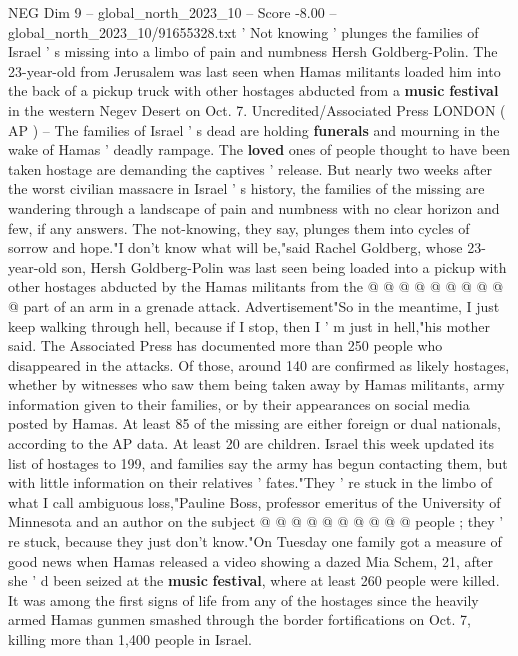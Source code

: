 \begin{textsample}{NEG Dim 9 – global\_north\_2023\_10 – Score -8.00 – global\_north\_2023\_10/91655328.txt}  \label{ex:f9_neg_040}
' Not knowing ' plunges the families of Israel ' s missing into a limbo of pain and numbness Hersh Goldberg-Polin.
The 23-year-old from Jerusalem was last seen when Hamas militants loaded him into the back of a pickup truck with other hostages abducted from a \textbf{music} \textbf{festival} in the western Negev Desert on Oct. 7.
Uncredited/Associated Press LONDON ( AP ) -- The families of Israel ' s dead are holding \textbf{funerals} and mourning in the wake of Hamas ' deadly rampage.
The \textbf{loved} ones of people thought to have been taken hostage are demanding the captives ' release.
But nearly two weeks after the worst civilian massacre in Israel ' s history, the families of the missing are wandering through a landscape of pain and numbness with no clear horizon and few, if any answers.
The not-knowing, they say, plunges them into cycles of sorrow and hope."I don't know what will be,"said Rachel Goldberg, whose 23-year-old son, Hersh Goldberg-Polin was last seen being loaded into a pickup with other hostages abducted by the Hamas militants from the @ @ @ @ @ @ @ @ @ @ part of an arm in a grenade attack.
Advertisement"So in the meantime, I just keep walking through hell, because if I stop, then I ' m just in hell,"his mother said.
The Associated Press has documented more than 250 people who disappeared in the attacks.
Of those, around 140 are confirmed as likely hostages, whether by witnesses who saw them being taken away by Hamas militants, army information given to their families, or by their appearances on social media posted by Hamas.
At least 85 of the missing are either foreign or dual nationals, according to the AP data.
At least 20 are children.
Israel this week updated its list of hostages to 199, and families say the army has begun contacting them, but with little information on their relatives ' fates."They ' re stuck in the limbo of what I call ambiguous loss,"Pauline Boss, professor emeritus of the University of Minnesota and an author on the subject @ @ @ @ @ @ @ @ @ @ people ; they ' re stuck, because they just don't know."On Tuesday one family got a measure of good news when Hamas released a video showing a dazed Mia Schem, 21, after she ' d been seized at the \textbf{music} \textbf{festival}, where at least 260 people were killed.
It was among the first signs of life from any of the hostages since the heavily armed Hamas gunmen smashed through the border fortifications on Oct. 7, killing more than 1,400 people in Israel.

\end{textsample}
